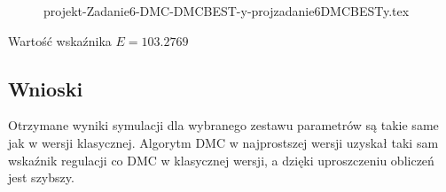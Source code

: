 \ifdefined\CompileFigures
    \begin{figure}[H] 
            \centering
            
            \caption{projekt-Zadanie6-DMC-DMCBEST-y-projzadanie6DMCBESTy.tex}
            \label{projekt:zad6:figure:projzadanie6DMCBESTy}
    \end{figure}
\fi

Wartość wskaźnika $E=\num{103.2769}$

\subsection{Wnioski}

Otrzymane wyniki symulacji dla wybranego zestawu parametrów są takie same jak w
wersji klasycznej.
\newline
Algorytm DMC w najprostszej wersji uzyskał taki sam wskaźnik regulacji co
DMC w klasycznej wersji, a dzięki uproszczeniu obliczeń jest szybszy.


\newpage
